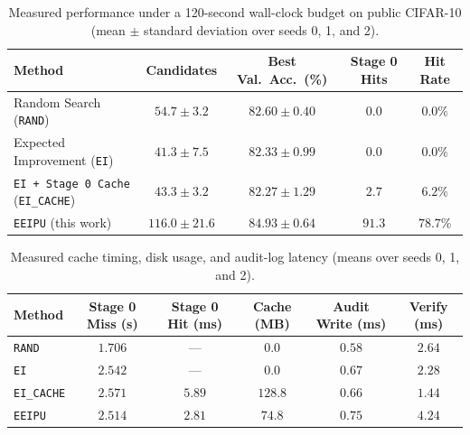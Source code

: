 \documentclass[11pt,letterpaper]{article}
\begin{document}
\begin{table}[h]
\centering
\footnotesize
\caption{Measured performance under a 120-second wall-clock budget on public CIFAR-10 (mean $\pm$ standard deviation over seeds 0, 1, and 2).}
\label{tab:results}
\begin{tabular}{@{}lcccc@{}}
\toprule
\textbf{Method} & \textbf{Candidates} & \textbf{Best Val.\ Acc.\ (\%)} & \textbf{Stage 0 Hits} & \textbf{Hit Rate} \\
\midrule
Random Search (\texttt{RAND}) & $54.7 \pm 3.2$ & $82.60 \pm 0.40$ & $0.0$ & $0.0\%$ \\
Expected Improvement (\texttt{EI}) & $41.3 \pm 7.5$ & $82.33 \pm 0.99$ & $0.0$ & $0.0\%$ \\
\texttt{EI + Stage 0 Cache} (\texttt{EI\_CACHE}) & $43.3 \pm 3.2$ & $82.27 \pm 1.29$ & $2.7$ & $6.2\%$ \\
\texttt{EEIPU} (this work) & $\mathbf{116.0 \pm 21.6}$ & $\mathbf{84.93 \pm 0.64}$ & $\mathbf{91.3}$ & $\mathbf{78.7\%}$ \\
\bottomrule
\end{tabular}
\end{table}



\begin{table}[h]
\centering
\footnotesize
\caption{Measured cache timing, disk usage, and audit-log latency (means over seeds 0, 1, and 2).}
\label{tab:overhead}
\begin{tabular}{@{}lccccc@{}}
\toprule
\textbf{Method} & \textbf{Stage 0 Miss (s)} & \textbf{Stage 0 Hit (ms)} & \textbf{Cache (MB)} & \textbf{Audit Write (ms)} & \textbf{Verify (ms)} \\
\midrule
\texttt{RAND} & $1.706$ & --- & $0.0$ & $0.58$ & $2.64$ \\
\texttt{EI} & $2.542$ & --- & $0.0$ & $0.67$ & $2.28$ \\
\texttt{EI\_CACHE} & $2.571$ & $5.89$ & $128.8$ & $0.66$ & $1.44$ \\
\texttt{EEIPU} & $2.514$ & $\mathbf{2.81}$ & $\mathbf{74.8}$ & $0.75$ & $4.24$ \\
\bottomrule
\end{tabular}
\end{table}
\end{document}
